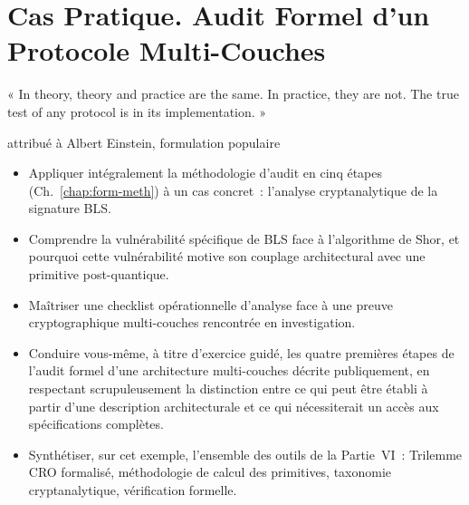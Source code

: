 
\chapter{Cas Pratique. Audit Formel d'un Protocole Multi-Couches}
\label{chap:cas-zknr}

\epigraph{%
    « In theory, theory and practice are the same. In practice, they are
    not. The true test of any protocol is in its implementation. »%
}{attribué à Albert Einstein, formulation populaire}


\begin{boxobjectifs}
\begin{itemize}
    \item Appliquer intégralement la méthodologie d'audit en cinq
          étapes (Ch.~\ref{chap:form-meth}) à un cas concret~:
          l'analyse cryptanalytique de la signature BLS.
    \item Comprendre la vulnérabilité spécifique de BLS face à
          l'algorithme de Shor, et pourquoi cette vulnérabilité
          motive son couplage architectural avec une primitive
          post-quantique.
    \item Maîtriser une checklist opérationnelle d'analyse face à
          une preuve cryptographique multi-couches rencontrée en
          investigation.
    \item Conduire vous-même, à titre d'exercice guidé, les quatre
          premières étapes de l'audit formel d'une architecture
          multi-couches décrite publiquement, en respectant
          scrupuleusement la distinction entre ce qui peut être
          établi à partir d'une description architecturale et ce
          qui nécessiterait un accès aux spécifications complètes.
    \item Synthétiser, sur cet exemple, l'ensemble des outils de
          la Partie~VI~: Trilemme CRO formalisé, méthodologie de
          calcul des primitives, taxonomie cryptanalytique,
          vérification formelle.
\end{itemize}
\end{boxobjectifs}

